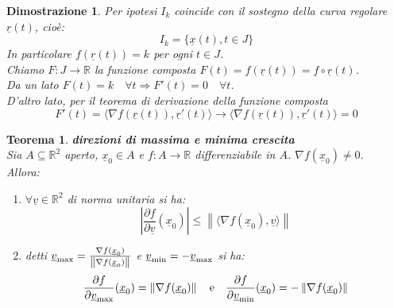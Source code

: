\documentclass{scrreprt}
\newtheorem{teorema}{Teorema}
\newenvironment{thm}{\begin{mdframed}[backgroundcolor=Ivory2]\begin{teorema}}{\end{teorema}\end{mdframed}}
\newtheorem{demnstrn}{Dimostrazione}
\newenvironment{dimostrazione}{\begin{mdframed}[backgroundcolor=LightCyan1]\begin{demnstrn}}{\end{demnstrn}\end{mdframed}}
\begin{document}
\begin{dimostrazione}
	Per ipotesi $I_k$ coincide con il sostegno della curva regolare $\underline{r}(t)$, cioè:
	\begin{equation}
		I_k = \{ \underline{x}(t), t \in J \}
	\end{equation}
	In particolare $f(\underline{r}(t)) = k$ per ogni $t \in J$.\\
	Chiamo $F:J\to \mathbb{R}$ la funzione composta $F(t) = f(\underline{r}(t)) = f \circ \underline{r}(t)$.\\
	Da un lato $F(t) = k \quad \forall t \Rightarrow F'(t) = 0 \quad \forall t$.\\
	D'altro lato, per il teorema di derivazione della funzione composta
	\begin{equation}
		F'(t) = \langle \nabla f(\underline{r}(t)), \underline{r}'(t) \rangle \longrightarrow \langle \nabla f(\underline{r}(t)), \underline{r}'(t) \rangle = 0
	\end{equation}
\end{dimostrazione}

\begin{thm} \textbf{direzioni di massima e minima crescita}\\
	Sia $A \subseteq \mathbb{R}^2$ aperto, $\underline{x}_0 \in A$ e $f: A \to \mathbb{R}$ differenziabile in $A$. $\nabla f(\underline{x}_0) \neq 0$.\\
	Allora:
	\begin{enumerate}
		\item[$i)$] $\forall \underline{v} \in \mathbb{R}^2$ di norma unitaria si ha:
					\begin{equation}
						\left\lvert \frac{\partial f}{\partial \underline{v}} (\underline{x}_0) \right\rvert \leq \left\lVert  \langle \nabla f(\underline{x}_0), \underline{v} \rangle\right\rVert 
					\end{equation}
		\item[$ii)$] detti $\underline{v}_{\textnormal{max}} = \frac{\nabla f (\underline{x}_0)}{\left\lVert \nabla f (\underline{x}_0)\right\rVert }$ e $\underline{v}_{\textnormal{min}} = - \underline{v}_{\textnormal{max}}$ si ha:
					\begin{equation}
						\frac{\partial f}{\partial \underline{v}_{\textnormal{max}} } (\underline{x}_0) = \left\lVert \nabla f (\underline{x}_0) \right\rVert \quad \textnormal{e} \quad \frac{\partial f}{\partial \underline{v}_{\textnormal{min}} } (\underline{x}_0) = - \left\lVert \nabla f (\underline{x}_0) \right\rVert
					\end{equation}
	\end{enumerate}
\end{thm}
\end{document}
